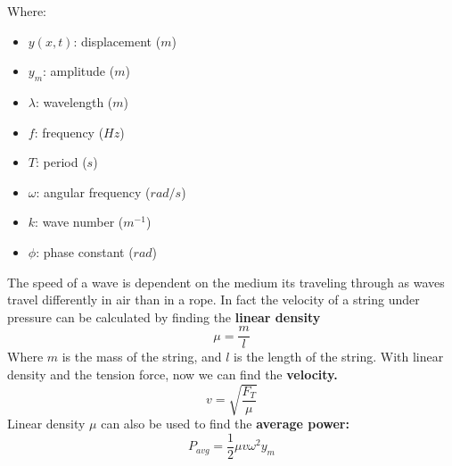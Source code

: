 \documentclass[11pt]{article}
\begin{document}
\hfill
\begin{minipage}[b]{0.5\textwidth}
    Where:
    \begin{itemize}
        \item $y(x,t)$: displacement ($m$)
        \item $y_m$: amplitude ($m$)
        \item $\lambda$: wavelength ($m$)
        \item $f$: frequency ($Hz$)
        \item $T$: period ($s$)
        \item $\omega$: angular frequency ($rad/s$)
        \item $k$: wave number ($m^{-1}$)
        \item $\phi$: phase constant ($rad$)
        \end{itemize}
\end{minipage}
\newline




 \noindent The speed of a wave is dependent on the medium its traveling through as waves travel differently in air than in a rope.
    In fact the velocity of a string under pressure can be calculated by
    finding the \textbf{linear density}
    \begin{equation}
        \mu = \frac{m}{l} \tag{linear density}
    \end{equation}
    Where $m$ is the mass of the string, and $l$ is the length of the string.
    With linear density and the tension force, now we can find the \textbf{velocity.}
    \begin{equation}
        v = \sqrt {\frac{F_T}{\mu}} \tag{wave velocity}
    \end{equation}
    Linear density $\mu$ can also be used to find the \textbf{average power:}
    \begin{equation}
        P_{avg} = \frac{1}{2} \mu v \omega^2 y_m \tag{average power}
    \end{equation}
\end{document}
